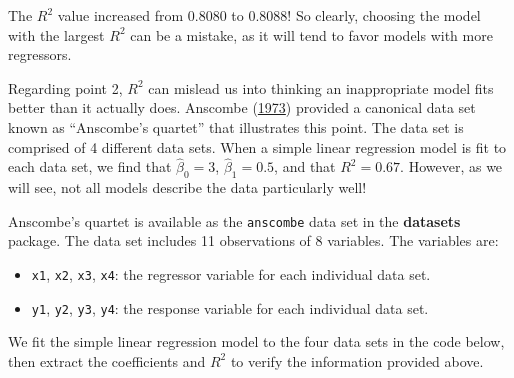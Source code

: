 \documentclass[
]{book}
\newenvironment{Shaded}{\begin{snugshade}}{\end{snugshade}}
\newcommand{\CommentTok}[1]{\textcolor[rgb]{0.56,0.35,0.01}{\textit{#1}}}
\newcommand{\DecValTok}[1]{\textcolor[rgb]{0.00,0.00,0.81}{#1}}
\newcommand{\DocumentationTok}[1]{\textcolor[rgb]{0.56,0.35,0.01}{\textbf{\textit{#1}}}}
\newcommand{\FunctionTok}[1]{\textcolor[rgb]{0.00,0.00,0.00}{#1}}
\newcommand{\NormalTok}[1]{#1}
\newcommand{\OtherTok}[1]{\textcolor[rgb]{0.56,0.35,0.01}{#1}}
\newcommand{\SpecialCharTok}[1]{\textcolor[rgb]{0.00,0.00,0.00}{#1}}
\providecommand{\tightlist}{%
  \setlength{\itemsep}{0pt}\setlength{\parskip}{0pt}}
\theoremstyle{definition}
\theoremstyle{definition}
\theoremstyle{definition}
\theoremstyle{definition}
\theoremstyle{remark}
\begin{document}
\begin{Shaded}
\end{Shaded}

The \(R^2\) value increased from 0.8080 to 0.8088! So clearly, choosing the model with the largest \(R^2\) can be a mistake, as it will tend to favor models with more regressors.

Regarding point 2, \(R^2\) can mislead us into thinking an inappropriate model fits better than it actually does. Anscombe (\protect\hyperlink{ref-anscombe1973graphs}{1973}) provided a canonical data set known as ``Anscombe's quartet'' that illustrates this point. The data set is comprised of 4 different data sets. When a simple linear regression model is fit to each data set, we find that \(\hat{\beta}_0=3\), \(\hat{\beta}_1=0.5\), and that \(R^2=0.67\). However, as we will see, not all models describe the data particularly well!

Anscombe's quartet is available as the \texttt{anscombe} data set in the \textbf{datasets} package. The data set includes 11 observations of
8 variables. The variables are:

\begin{itemize}
\tightlist
\item
  \texttt{x1}, \texttt{x2}, \texttt{x3}, \texttt{x4}: the regressor variable for each individual data set.
\item
  \texttt{y1}, \texttt{y2}, \texttt{y3}, \texttt{y4}: the response variable for each individual data set.
\end{itemize}

We fit the simple linear regression model to the four data sets in the code below, then extract the coefficients and \(R^2\) to verify the information provided above.
\end{document}
